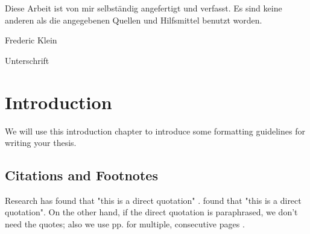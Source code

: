 
%



	
\restoregeometry


\clearpage
\vspace*{\fill}
\begin{center}
	\begin{minipage}{.8\textwidth}
		\thispagestyle{empty} %
		Diese Arbeit ist von mir selbst\"andig angefertigt und verfasst. Es sind keine anderen als die angegebenen Quellen und Hilfsmittel benutzt worden.\par
		\vspace{1cm}
		Frederic Klein \dotfill \par
		Unterschrift
	\end{minipage}
\end{center}
\vfill %
\clearpage


\begin{abstract}
	\thispagestyle{plain}
	\setcounter{page}{1}
	\lipsum[1-3]
\end{abstract}

\tableofcontents
\setcounter{page}{2}
\listoffigures
{\let\clearpage\relax \listoftables}

\printnoidxglossary[type=\acronymtype,title={List of Acronyms}]

{\let\clearpage\relax \printnoidxglossary[type=symbols,sort=letter]}

\chapter{Introduction}
We will use this introduction chapter to introduce some formatting guidelines for writing your thesis.

\section{Citations and Footnotes}
Research has found that "this is a direct quotation" \autocite[p. 1]{Doe:1}. \textcite[p. 1]{Doe:1} found that "this is a direct quotation". On the other hand, if the direct quotation is paraphrased, we don't need the quotes; also we use pp. for multiple, consecutive pages \autocite[pp. 35-37]{Doe:2}.\par

